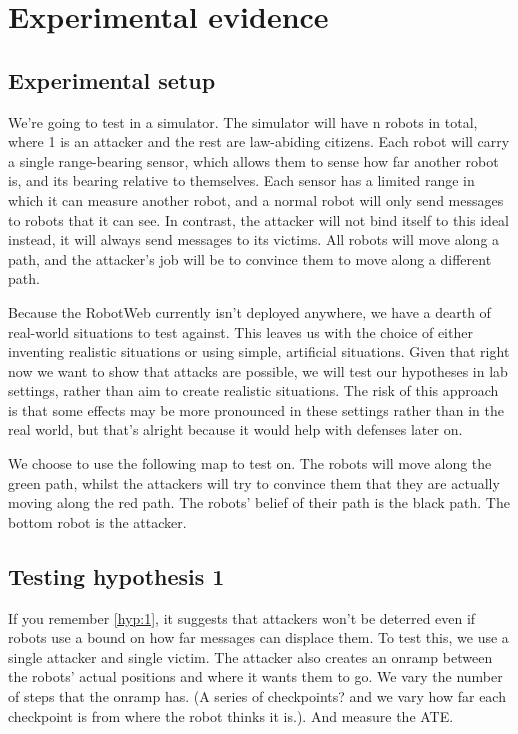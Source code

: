 \section{Experimental evidence}
\subsection{Experimental setup}
We're going to test in a simulator. The simulator will have n robots in total, where 1 is an attacker and the rest are law-abiding citizens. Each robot will carry a single range-bearing sensor, which allows them to sense how far another robot is, and its bearing relative to themselves. Each sensor has a limited range in which it can measure another robot, and a normal robot will only send messages to robots that it can see. In contrast, the attacker will not bind itself to this ideal instead, it will always send messages to its victims. All robots will move along a path, and the attacker's job will be to convince them to move along a different path.

Because the RobotWeb currently isn't deployed anywhere, we have a dearth of real-world situations to test against. This leaves us with the choice of either inventing realistic situations or using simple, artificial situations. Given that right now we want to show that attacks are possible, we will test our hypotheses in lab settings, rather than aim to create realistic situations. The risk of this approach is that some effects may be more pronounced in these settings rather than in the real world, but that's alright because it would help with defenses later on.

We choose to use the following map to test on. The robots will move along the green path, whilst the attackers will try to convince them that they are actually moving along the red path. The robots' belief of their path is the black path. The bottom robot is the attacker.

\subsection{Testing hypothesis 1}
If you remember \ref{hyp:1}, it suggests that attackers won't be deterred even if robots use a bound on how far messages can displace them. To test this, we use a single attacker and single victim. The attacker also creates an onramp between the robots' actual positions and where it wants them to go. We vary the number of steps that the onramp has. (A series of checkpoints? and we vary how far each checkpoint is from where the robot thinks it is.). And measure the ATE.


